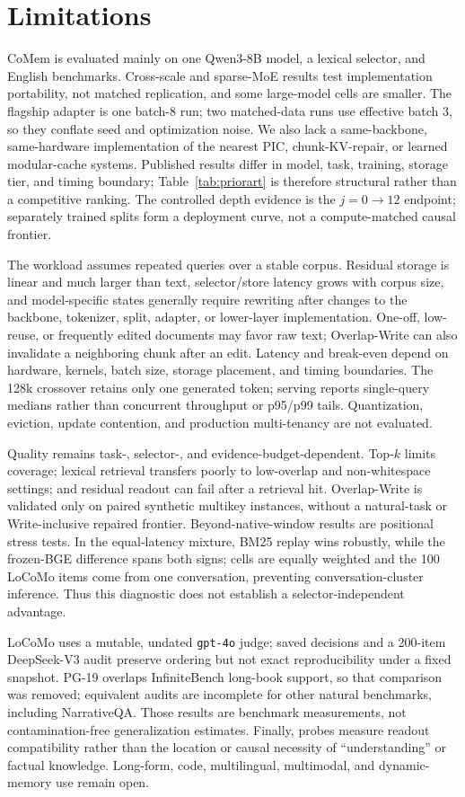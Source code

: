 \section*{Limitations}

CoMem is evaluated mainly on one Qwen3-8B model, a lexical selector, and English
benchmarks. Cross-scale and sparse-MoE results test implementation portability,
not matched replication, and some large-model cells are smaller. The flagship
adapter is one batch-8 run; two matched-data runs use effective batch 3, so they
conflate seed and optimization noise. We also lack a same-backbone,
same-hardware implementation of the nearest PIC, chunk-KV-repair, or learned
modular-cache systems. Published results differ in model, task, training,
storage tier, and timing boundary; Table~\ref{tab:priorart} is therefore
structural rather than a competitive ranking. The controlled depth evidence is
the $j{=}0\!\rightarrow\!12$ endpoint; separately trained splits form a
deployment curve, not a compute-matched causal frontier.

The workload assumes repeated queries over a stable corpus. Residual storage is
linear and much larger than text, selector/store latency grows with corpus size,
and model-specific states generally require rewriting after changes to the
backbone, tokenizer, split, adapter, or lower-layer implementation. One-off,
low-reuse, or frequently edited documents may favor raw text; Overlap-Write can
also invalidate a neighboring chunk after an edit. Latency and break-even depend
on hardware, kernels, batch size, storage placement, and timing boundaries. The
128k crossover retains only one generated token; serving reports single-query
medians rather than concurrent throughput or p95/p99 tails. Quantization,
eviction, update contention, and production multi-tenancy are not evaluated.

Quality remains task-, selector-, and evidence-budget-dependent. Top-$k$ limits
coverage; lexical retrieval transfers poorly to low-overlap and non-whitespace
settings; and residual readout can fail after a retrieval hit. Overlap-Write is
validated only on paired synthetic multikey instances, without a natural-task or
Write-inclusive repaired frontier. Beyond-native-window results are positional
stress tests. In the equal-latency mixture, BM25 replay wins robustly, while the
frozen-BGE difference spans both signs; cells are equally weighted and the 100
LoCoMo items come from one conversation, preventing conversation-cluster
inference. Thus this diagnostic does not establish a selector-independent
advantage.

LoCoMo uses a mutable, undated \texttt{gpt-4o} judge; saved decisions and a
200-item DeepSeek-V3 audit preserve ordering but not exact reproducibility under
a fixed snapshot. PG-19 overlaps InfiniteBench long-book support, so that
comparison was removed; equivalent audits are incomplete for other natural
benchmarks, including NarrativeQA. Those results are benchmark measurements,
not contamination-free generalization estimates. Finally, probes measure
readout compatibility rather than the location or causal necessity of
``understanding'' or factual knowledge. Long-form, code, multilingual,
multimodal, and dynamic-memory use remain open.
